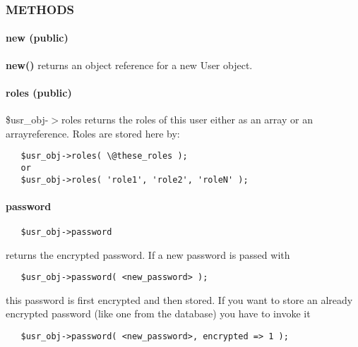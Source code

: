 \subsubsection*{METHODS\label{Apiis::DataBase::User_--_collecting_and_providing_user_data_METHODS}}
\paragraph*{new (public)\label{Apiis::DataBase::User_--_collecting_and_providing_user_data_new_public_}}


\textbf{new()} returns an object reference for a new User object.

\paragraph*{roles (public)\label{Apiis::DataBase::User_--_collecting_and_providing_user_data_roles_public_}}


\$usr\_obj-$>$roles returns the roles of this user either as an array or an
arrayreference.
Roles are stored here by:

\begin{verbatim}
   $usr_obj->roles( \@these_roles );
   or
   $usr_obj->roles( 'role1', 'role2', 'roleN' );
\end{verbatim}
\paragraph*{password\label{Apiis::DataBase::User_--_collecting_and_providing_user_data_password}}
\begin{verbatim}
   $usr_obj->password
\end{verbatim}


returns the encrypted password. If a new password is passed with

\begin{verbatim}
   $usr_obj->password( <new_password> );
\end{verbatim}


this password is first encrypted and then stored. If you want to store an already
encrypted password (like one from the database) you have to invoke it

\begin{verbatim}
   $usr_obj->password( <new_password>, encrypted => 1 );
\end{verbatim}
